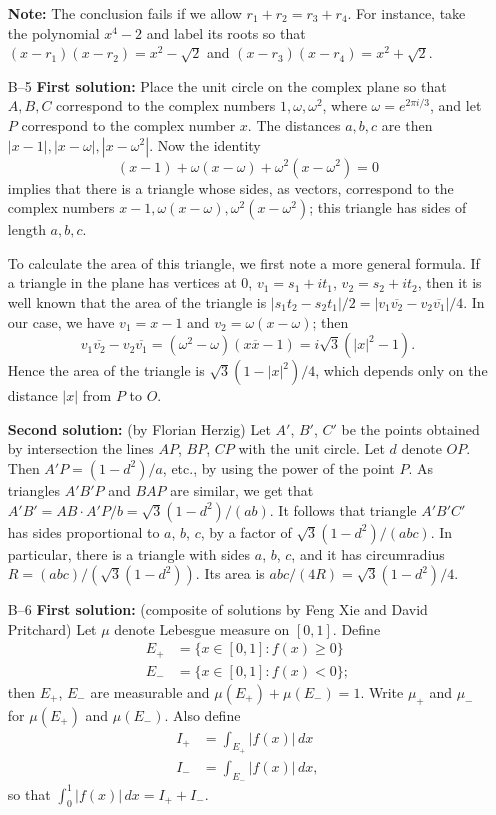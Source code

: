 \documentclass[amssymb,twocolumn,pra,10pt,aps]{revtex4-1}
\begin{document}
\begin{itemize}
\textbf{Note:} The conclusion fails if we allow
$r_1 + r_2 = r_3 + r_4$. For
instance, take the polynomial $x^4 - 2$ and label its roots so that
$(x-r_1)(x-r_2) = x^2 - \sqrt{2}$ and
$(x-r_3)(x-r_4) = x^2 + \sqrt{2}$.

\item[B--5]
\textbf{First solution:}
Place the unit circle on the complex plane so that $A,B,C$ correspond
to the complex numbers $1,\omega,\omega^2$, where
$\omega=e^{2\pi i/3}$, and let $P$ correspond to the complex number
$x$. The distances $a,b,c$ are then $|x-1|,|x-\omega|,|x-\omega^2|$.
Now the identity
\[
(x-1) + \omega(x-\omega) + \omega^2(x-\omega^2) = 0
\]
implies that there is a triangle whose sides, as vectors, correspond
to the complex numbers $x-1, \omega(x-\omega), \omega^2(x-\omega^2)$;
this triangle has sides of length $a,b,c$.

To calculate the area of this triangle, we first note a more general
formula. If a triangle in the plane has vertices at $0$,
$v_1=s_1+it_1$, $v_2=s_2+it_2$, then it is well known that the area
of the triangle is $|s_1t_2-s_2t_1|/2 = |v_1\overline{v_2}-
v_2\overline{v_1}|/4$. In our case, we have $v_1 = x-1$
and $v_2 = \omega(x-\omega)$; then
\[
v_1\overline{v_2} - v_2\overline{v_1}
= (\omega^2-\omega)(x\overline{x}-1)
= i\sqrt{3}(|x|^2-1).
\]
Hence the area of the triangle is $\sqrt{3}(1-|x|^2)/4$, which depends
only on the distance $|x|$ from $P$ to $O$.

\textbf{Second solution:} (by Florian Herzig)
Let $A'$, $B'$, $C'$ be the points obtained by intersection the lines
$AP$, $BP$, $CP$ with the unit circle. Let $d$ denote $OP$. Then $A'P =
(1-d^2)/a$, etc., by using the power of the point $P$. As triangles $A'B'P$
and $BAP$ are similar, we get that $A'B' = AB \cdot A'P/b = \sqrt 3
(1-d^2)/(ab)$. It follows that triangle $A'B'C'$ has sides proportional
to $a$, $b$, $c$, by a factor of $\sqrt 3 (1-d^2)/(abc)$. In particular,
there is a triangle with sides $a$, $b$, $c$, and it has circumradius $R =
(abc)/(\sqrt 3 (1-d^2))$. Its area is $abc/(4R) = \sqrt 3 (1-d^2)/4$.

\item[B--6]
\textbf{First solution:} (composite of solutions by Feng Xie and David
Pritchard)
Let $\mu$ denote Lebesgue measure on $[0,1]$. Define
\begin{align*}
E_+ &= \{x \in [0,1]: f(x) \geq 0\} \\
E_- &= \{x \in [0,1]: f(x) < 0\};
\end{align*}
then $E_+$, $E_-$ are measurable and $\mu(E_+) + \mu(E_-) = 1$.
Write $\mu_+$ and $\mu_-$ for $\mu(E_+)$ and $\mu(E_-)$.
Also define
\begin{align*}
I_+ &= \int_{E_+} |f(x)|\,dx \\
I_- &= \int_{E_-} |f(x)|\,dx,
\end{align*}
so that $\int_0^1 |f(x)|\,dx = I_+ + I_-$.


\end{itemize}
\end{document}
